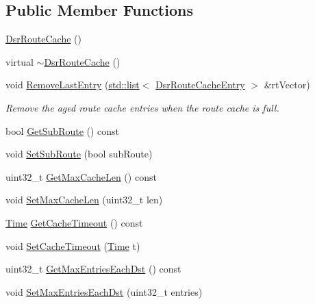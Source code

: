 \subsection*{Public Member Functions}
\begin{DoxyCompactItemize}
\item 
\hyperlink{classns3_1_1dsr_1_1DsrRouteCache_a160d3e218ffa72ba6965e1adc762acdb}{Dsr\+Route\+Cache} ()
\item 
virtual \hyperlink{classns3_1_1dsr_1_1DsrRouteCache_a73c24c18055fd681989ae5936f7707bb}{$\sim$\+Dsr\+Route\+Cache} ()
\item 
void \hyperlink{classns3_1_1dsr_1_1DsrRouteCache_ad02a476e6b440f517898c11bffac4f27}{Remove\+Last\+Entry} (\hyperlink{openflow-interface_8h_afd9bcfa176617760671b67580f536fa7}{std\+::list}$<$ \hyperlink{classns3_1_1dsr_1_1DsrRouteCacheEntry}{Dsr\+Route\+Cache\+Entry} $>$ \&rt\+Vector)
\begin{DoxyCompactList}\small\item\em Remove the aged route cache entries when the route cache is full. \end{DoxyCompactList}\item 
bool \hyperlink{classns3_1_1dsr_1_1DsrRouteCache_ab76148a6e265c638634afe659e78e5e9}{Get\+Sub\+Route} () const 
\item 
void \hyperlink{classns3_1_1dsr_1_1DsrRouteCache_ab2f735c580ae565f66b394e816b65379}{Set\+Sub\+Route} (bool sub\+Route)
\item 
uint32\+\_\+t \hyperlink{classns3_1_1dsr_1_1DsrRouteCache_afa374702182edc67c96a395d0f7ef282}{Get\+Max\+Cache\+Len} () const 
\item 
void \hyperlink{classns3_1_1dsr_1_1DsrRouteCache_a5632a123b828a0e9d8f095312d47f24d}{Set\+Max\+Cache\+Len} (uint32\+\_\+t len)
\item 
\hyperlink{classns3_1_1Time}{Time} \hyperlink{classns3_1_1dsr_1_1DsrRouteCache_a1bacac337434c239c93b0f2c2c05320a}{Get\+Cache\+Timeout} () const 
\item 
void \hyperlink{classns3_1_1dsr_1_1DsrRouteCache_abf1f0b065a008e6d03ab0628a18857f4}{Set\+Cache\+Timeout} (\hyperlink{classns3_1_1Time}{Time} t)
\item 
uint32\+\_\+t \hyperlink{classns3_1_1dsr_1_1DsrRouteCache_abb6ef065b4ba2dde024e9b2f168dc55c}{Get\+Max\+Entries\+Each\+Dst} () const 
\item 
void \hyperlink{classns3_1_1dsr_1_1DsrRouteCache_a75392ef964c119da3f5c4ccbbb8264f7}{Set\+Max\+Entries\+Each\+Dst} (uint32\+\_\+t entries)
\item 

\end{DoxyCompactItemize}
